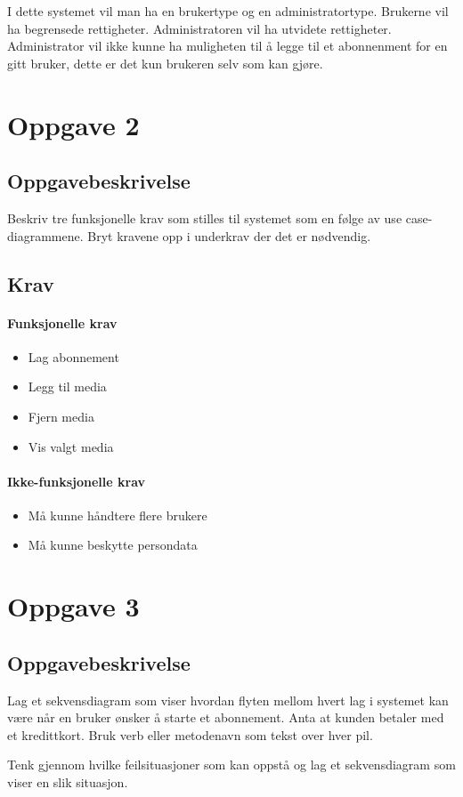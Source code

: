 \documentclass{article}
\begin{document}
I dette systemet vil man ha en brukertype og en administratortype. Brukerne vil ha begrensede rettigheter. Administratoren vil ha utvidete rettigheter. Administrator vil ikke kunne ha muligheten til å legge til et abonnenment for en gitt bruker, dette er det kun brukeren selv som kan gjøre.

\section{Oppgave  2}
\subsection{Oppgavebeskrivelse}
Beskriv tre funksjonelle krav som stilles til systemet som en følge av use case-diagrammene. Bryt kravene opp i underkrav der det er nødvendig.
\subsection{Krav}
\paragraph{Funksjonelle krav}
\begin{itemize}
\item Lag abonnement
\item Legg til media
\item Fjern media
\item Vis valgt media
\end{itemize}

\paragraph{Ikke-funksjonelle krav}
\begin{itemize}
\item Må kunne håndtere flere brukere
\item Må kunne beskytte persondata
\end{itemize}

\section{Oppgave 3}
\subsection{Oppgavebeskrivelse}
Lag et sekvensdiagram som viser hvordan flyten mellom hvert lag i systemet kan være når en bruker ønsker å starte et abonnement. Anta at kunden betaler med et kredittkort. Bruk verb eller metodenavn som tekst over hver pil.

Tenk gjennom hvilke feilsituasjoner som kan oppstå og lag et sekvensdiagram som viser en slik situasjon.
\end{document}
